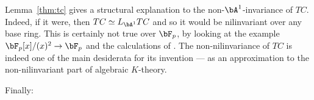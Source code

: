 \documentclass[a4paper,10pt]{amsart}
\begin{document}




\begin{rem} \label{rem:tc} Lemma~\ref{thm:tc} gives a structural explanation to the non-$\bA^1$-invariance of $TC$. Indeed, if it were, then $TC \simeq L_{\bA^1}TC$ and so it would be nilinvariant over any base ring. This is certainly not true over $\bF_p$, by looking at the example $\bF_p[x]/(x)^2 \rightarrow \bF_p$ and the calculations of \cite{hm-poly, speirs-poly}. The non-nilinvariance of $TC$ is indeed one of the main desiderata for its invention --- as an approximation to the non-nilinvariant part of algebraic $K$-theory.

\end{rem}

 Finally:
\end{document}
